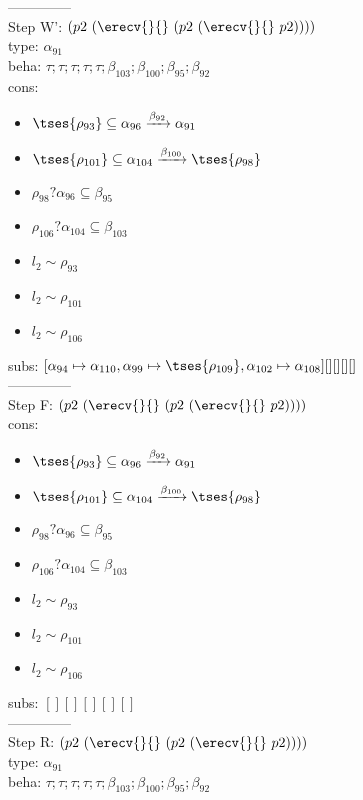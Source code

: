 \documentclass[12pt]{article}
\begin{document}
  --------------\\ 
Step W': $ (p2~(\erecv{}{}~(p2~(\erecv{}{}~p2)))) $\\
  type: $ \alpha_{91} $ 
\\  beha: $ \tau; \tau; \tau; \tau; \tau; \beta_{103}; \beta_{100}; \beta_{95}; \beta_{92} $ 
\\  cons: \begin{itemize}
\item $  \tses{ \rho_{93}} \subseteq \alpha_{96} \xrightarrow{\beta_{92}} \alpha_{91} $
\item $  \tses{ \rho_{101}} \subseteq \alpha_{104} \xrightarrow{\beta_{100}}  \tses{ \rho_{98}} $
\item $ \rho_{98}?\alpha_{96} \subseteq \beta_{95} $
\item $ \rho_{106}?\alpha_{104} \subseteq \beta_{103} $
\item $ l_{2} \sim\rho_{93} $
\item $ l_{2} \sim\rho_{101} $
\item $ l_{2} \sim\rho_{106} $
\end{itemize} 
  subs:  $ [ \alpha_{94}\mapsto\alpha_{110}, \alpha_{99}\mapsto \tses{ \rho_{109}}, \alpha_{102}\mapsto\alpha_{108}] [] [] [] [] $  
 \\--------------\\ 
Step F: $ (p2~(\erecv{}{}~(p2~(\erecv{}{}~p2)))) $
 \\ cons: \begin{itemize}
\item $  \tses{ \rho_{93}} \subseteq \alpha_{96} \xrightarrow{\beta_{92}} \alpha_{91} $
\item $  \tses{ \rho_{101}} \subseteq \alpha_{104} \xrightarrow{\beta_{100}}  \tses{ \rho_{98}} $
\item $ \rho_{98}?\alpha_{96} \subseteq \beta_{95} $
\item $ \rho_{106}?\alpha_{104} \subseteq \beta_{103} $
\item $ l_{2} \sim\rho_{93} $
\item $ l_{2} \sim\rho_{101} $
\item $ l_{2} \sim\rho_{106} $
\end{itemize}
 subs:  $ [ ] [] [] [] [] $ 
  \\--------------\\ 
Step R: $ (p2~(\erecv{}{}~(p2~(\erecv{}{}~p2)))) $\\
  type: $ \alpha_{91} $ 
\\  beha: $ \tau; \tau; \tau; \tau; \tau; \beta_{103}; \beta_{100}; \beta_{95}; \beta_{92} $ 
\end{document}
